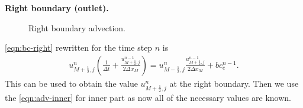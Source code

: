 \documentclass{article}
\begin{document}
\textbf{Right boundary (outlet).}
\begin{figure}[H] %
  \caption{Right boundary advection.}\label{fig:ADV-right}
\end{figure}
\cref{eqn:bc-right} rewritten for the time step $n$ is
\begin{equation}
\begin{gathered}
{{u}^{n}_{M+\frac{1}{2},j}}\left(\frac{1}{\Delta t} + \frac{u^{n-1}_{M+\frac{1}{2},j}}{2\Delta x_M}\right)
=
u^{n}_{M-\frac{1}{2},j}\frac{u^{n-1}_{M+\frac{1}{2},j}}{2\Delta x_M}+bc_e^{n-1}.
\end{gathered}
\end{equation}
This can be used to obtain the value $u^{n}_{M+\frac{1}{2},j}$ at the right boundary. Then we use the \cref{eqn:adv-inner} for inner part as now all of the necessary values are known.  
\end{document}
